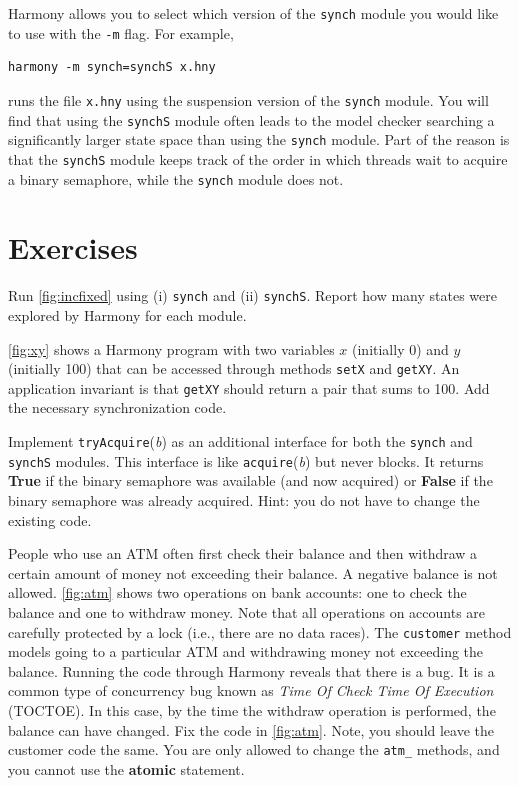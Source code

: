 \documentclass{report}
\newenvironment{code}{
\tcolorbox
}{
\endtcolorbox
}
\begin{document}
Harmony allows you to select which version of the \texttt{synch} module you would
like to use with the \texttt{-m} flag.
%
For example,

\begin{code}
\begin{verbatim}
harmony -m synch=synchS x.hny
\end{verbatim}
\end{code}

runs the file \texttt{x.hny} using the suspension version of the \texttt{synch} module.
You will find that using the \texttt{synchS} module often leads to
the model checker searching a
significantly larger state space than using the \texttt{synch} module.
Part of the reason is that the \texttt{synchS} module keeps track of the order
in which threads wait to acquire a binary semaphore, while the \texttt{synch} module does not.

\section*{Exercises}
\begin{problems}
\item
Run \autoref{fig:incfixed} using (i) \texttt{synch} and (ii) \texttt{synchS}.
Report how many states were explored by Harmony for each module.
\item \label{ex:xy} \autoref{fig:xy} shows a Harmony program with two variables $x$
(initially 0) and $y$ (initially 100) that can be accessed through methods
\texttt{setX} and \texttt{getXY}.  An application invariant is that \texttt{getXY}
should return a pair that sums to 100.  Add the necessary synchronization code.
\item \label{ex:trylock} Implement \texttt{tryAcquire}(\textit{b}) as an additional
interface for both the \texttt{synch} and \texttt{synchS} modules.
This interface is like \texttt{acquire}(\textit{b}) but never blocks.  It
returns \textbf{True} if the binary semaphore was available (and now acquired) or \textbf{False}
if the binary semaphore was already acquired.
Hint: you do not have to change the existing code.
\item People who use an ATM often first check their balance and then withdraw
a certain amount of money not exceeding their balance.  A negative balance
is not allowed.  \autoref{fig:atm} shows two operations on bank accounts:
one to check the balance and one to withdraw money.
Note that all operations on accounts are carefully protected by a lock
(i.e., there are no data races).
The \texttt{customer}
method models going to a particular ATM and withdrawing money not exceeding
the balance.
Running the code through Harmony reveals that there is a bug.
It is a common type of concurrency bug known as \emph{Time Of Check Time Of
Execution} (TOCTOE).
In this case, by the time the withdraw operation is performed,
the balance can have changed.
Fix the code in \autoref{fig:atm}.  Note, you should leave the
customer code the same. You are only allowed to change the
\texttt{atm\_} methods, and you cannot use the \textbf{atomic}
statement.
\end{problems}
\end{document}

